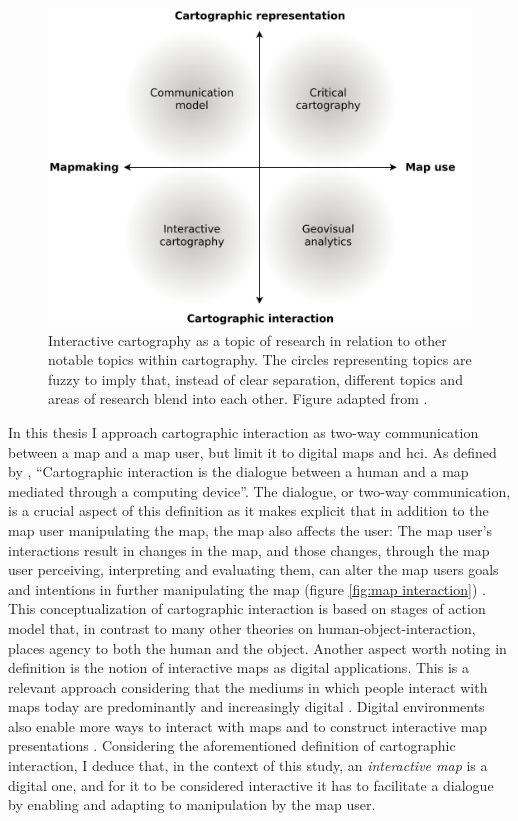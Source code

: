\begin{figure}[H]
	\centering
	\includegraphics[width=\diagramwidth]{visual/figures/diagrams/cartography_topics.png}
	\caption{
		Interactive cartography as a topic of research
		in relation to other notable topics within cartography.
		The circles representing topics are fuzzy to imply that,
		instead of clear separation,
		different topics and areas of research blend into each other.
		Figure adapted from \textcite{rot2013b}.
	}
	\label{fig:cartography topics}
\end{figure}


In this thesis I approach cartographic interaction as
two-way communication between a map and a map user,
but limit it to digital maps and \acrshort{hci}.
As defined by \textcite[p.~14]{rot2011},
\enquote{Cartographic interaction is the dialogue between a human and a map
mediated through a computing device}.
The dialogue, or two-way communication, is a crucial aspect of this definition
as it makes explicit that in addition to the map user manipulating the map,
the map also affects the user:
The map user's interactions result in changes in the map,
and those changes, through the map user perceiving, interpreting and evaluating them,
can alter the map users goals and intentions
in further manipulating the map (figure \ref{fig:map interaction}) \parencite{rot2012}.
This conceptualization of cartographic interaction
is based on 
stages of action model that,
in contrast to many other theories on human-object-interaction,
places agency to both the human and the object.
Another aspect worth noting in  definition
is the notion of interactive maps as digital applications.
This is a relevant approach considering
that the mediums in which people interact with maps today
are predominantly and increasingly digital \parencite{mei2019}.
Digital environments also enable more ways to interact with maps
and to construct interactive map presentations \parencite{rot2013b, mei2019}.
Considering the aforementioned definition of cartographic interaction,
I deduce that, in the context of this study,
an \textit{interactive map} is a digital one,
and for it to be considered interactive it has to
facilitate a dialogue by enabling and adapting to manipulation by the map user.

